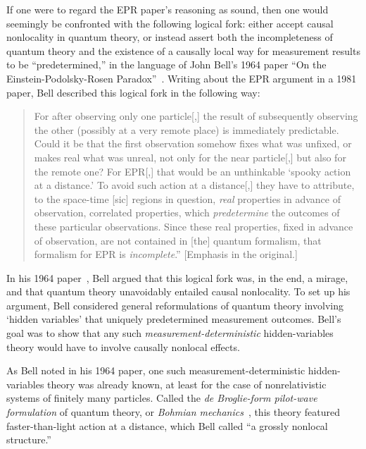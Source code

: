 \documentclass[12pt,english,prl,superscriptaddress,nobibnotes,nofootinbib]{revtex4-2}
\begin{document}
If one were to regard the EPR paper's reasoning as sound, then one
would seemingly be confronted with the following logical fork: either
accept causal nonlocality in quantum theory, or instead assert both
the incompleteness of quantum theory and the existence of a causally
local way for measurement results to be ``predetermined,'' in the
language of John Bell's 1964 paper ``On the Einstein-Podolsky-Rosen
Paradox''~\citep{Bell:1964oeprp}. Writing about the EPR argument
in a 1981 paper, Bell described this logical fork in the following
way: 
\begin{quotation}
For after observing only one particle{[},{]} the result of subsequently
observing the other (possibly at a very remote place) is immediately
predictable. Could it be that the first observation somehow fixes
what was unfixed, or makes real what was unreal, not only for the
near particle{[},{]} but also for the remote one? For EPR{[},{]} that
would be an unthinkable \textquoteleft spooky action at a distance.\textquoteright{}
To avoid such action at a distance{[},{]} they have to attribute,
to the space-time {[}sic{]} regions in question, \emph{real} properties
in advance of observation, correlated properties, which \emph{predetermine}
the outcomes of these particular observations. Since these real properties,
fixed in advance of observation, are not contained in {[}the{]} quantum
formalism, that formalism for EPR is \emph{incomplete}.'' {[}Emphasis
in the original.{]}~\citep{Bell:1981bssatnor}
\end{quotation}

In his 1964 paper~\citep{Bell:1964oeprp}, Bell argued that this
logical fork was, in the end, a mirage, and that quantum theory unavoidably
entailed causal nonlocality. To set up his argument, Bell considered
general reformulations of quantum theory involving \textquoteleft hidden
variables\textquoteright{} that uniquely predetermined measurement
outcomes. Bell's goal was to show that any such \emph{measurement-deterministic}
hidden-variables theory would have to involve causally nonlocal effects.

As Bell noted in his 1964 paper, one such measurement-deterministic
hidden-variables theory was already known, at least for the case of
nonrelativistic systems of finitely many particles. Called the \emph{de Broglie-form pilot-wave formulation}
of quantum theory, or \emph{Bohmian mechanics}~\citep{deBroglie:1930iswm,Bohm:1952siqtthvi,Bohm:1952siqtthvii},
this theory featured faster-than-light action at a distance, which
Bell called ``a grossly nonlocal structure.'' 
\end{document}
